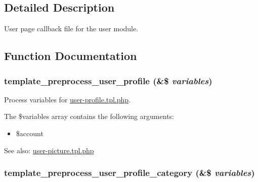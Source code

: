 \subsection{Detailed Description}
User page callback file for the user module. 

\subsection{Function Documentation}
\hypertarget{user_8pages_8inc_5a1229a0cb26128b7efab80c025e2d75}{
\subsubsection[{template\_\-preprocess\_\-user\_\-profile}]{\setlength{\rightskip}{0pt plus 5cm}template\_\-preprocess\_\-user\_\-profile (\&\$ {\em variables})}}
\label{user_8pages_8inc_5a1229a0cb26128b7efab80c025e2d75}


Process variables for \hyperlink{user-profile_8tpl_8php}{user-profile.tpl.php}.

The \$variables array contains the following arguments:\begin{itemize}
\item \$account\end{itemize}


\begin{Desc}
\item[See also:]\hyperlink{user-picture_8tpl_8php}{user-picture.tpl.php} \end{Desc}
\hypertarget{user_8pages_8inc_0b8961894318ad623017b48569515d4a}{
\subsubsection[{template\_\-preprocess\_\-user\_\-profile\_\-category}]{\setlength{\rightskip}{0pt plus 5cm}template\_\-preprocess\_\-user\_\-profile\_\-category (\&\$ {\em variables})}}
\label{user_8pages_8inc_0b8961894318ad623017b48569515d4a}


